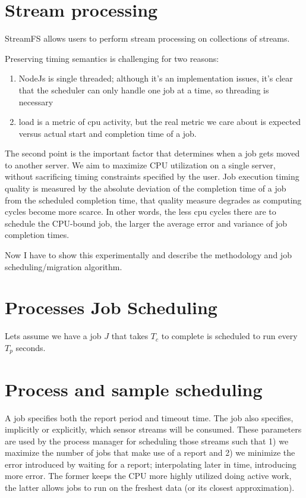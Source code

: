 \documentclass[10pt,print,letterpaper]{sigplan-proc-varsize}
\begin{document}
\section{Stream processing}
StreamFS allows users to perform stream processing on collections of streams.

Preserving timing semantics is challenging for two reasons:

\begin{enumerate}
\item NodeJs is single threaded; although it's an implementation issues, it's clear that
the scheduler can only handle one job at a time, so threading is necessary
\item load is a metric of cpu activity, but the real metric we care about is expected versus
actual start and completion time of a job.
\end{enumerate}

The second point is the important factor that determines when a job gets moved to another server.
We aim to maximize CPU utilization on a single server, without sacrificing timing constraints specified
by the user.  Job execution timing quality is measured by the absolute deviation of the completion
time of a job from the scheduled completion time, that quality measure degrades as computing cycles
become more scarce.  In other words, the less cpu cycles there are to schedule the CPU-bound job, the
larger the average error and variance of job completion times.

Now I have to show this experimentally and describe the methodology and job scheduling/migration algorithm.




\section{Processes Job Scheduling}
Lets assume we have a job $J$ that takes $T_{c}$ to complete is scheduled to run every $T_{p}$ seconds. 


\section{Process and sample scheduling}
A job specifies both the report period and timeout time.  The job also specifies, implicitly or
explicitly, which sensor streams will be consumed.  These parameters are used by the process manager
for scheduling those streams such that 1) we maximize the number of jobs that make use of a report
and 2) we minimize the error introduced by waiting for a report; interpolating later in time, introducing
more error.  The former keeps the CPU more highly utilized doing active work, the latter allows jobs to 
run on the freshest data (or its closest approximation).  
\end{document}
